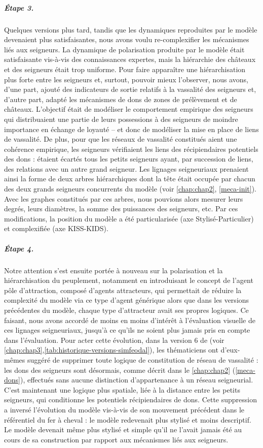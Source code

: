 \subparagraph{Étape 3.}
Quelques versions plus tard, tandis que les dynamiques reproduites par le modèle devenaient plus satisfaisantes, nous avons voulu re-complexifier les mécanismes liés aux seigneurs.
La dynamique de polarisation produite par le modèle était satisfaisante vis-à-vis des connaissances expertes, mais la hiérarchie des châteaux et des seigneurs était trop uniforme.
Pour faire apparaître une hiérarchisation plus forte entre les seigneurs et, surtout, pouvoir mieux l'observer, nous avons, d'une part, ajouté des indicateurs de sortie relatifs à la vassalité des seigneurs et, d'autre part, adapté les mécanismes de dons de zones de prélèvement et de châteaux.
L'objectif était de modéliser le comportement empirique des seigneurs qui distribuaient une partie de leurs possessions à des seigneurs de moindre importance en échange de loyauté -- et donc de modéliser la mise en place de liens de vassalité.
De plus, pour que les réseaux de vassalité constitués aient une cohérence empirique, les seigneurs vérifiaient les liens des récipiendaires potentiels des dons :
	étaient écartés tous les petits seigneurs ayant, par succession de liens, des relations avec un autre grand seigneur.
Les lignages seigneuriaux prenaient ainsi la forme de deux arbres hiérarchiques dont la tête était occupée par chacun des deux grands seigneurs concurrents du modèle (voir \cref{chap:chap2}, \cref{meca-init}).
Avec les graphes constitués par ces arbres, nous pouvions alors mesurer leurs degrés, leurs diamètres, la somme des puissances des seigneurs, etc.
Par ces modifications, la position du modèle a été particularisée (axe Stylisé-Particulier) et complexifiée (axe KISS-KIDS).

\subparagraph{Étape 4.}
Notre attention s'est ensuite portée à nouveau sur la polarisation et la hiérarchisation du peuplement, notamment en introduisant le concept de l'agent \og pôle d'attraction\fg{}, composé d'agents attracteurs, qui permettait de réduire la complexité du modèle via ce type d'agent générique alors que dans les versions précédentes du modèle, chaque type d'attracteur avait ses propres logiques.
Ce faisant, nous avons accordé de moins en moins d'intérêt à l'évaluation visuelle de ces lignages seigneuriaux, jusqu'à ce qu'ils ne soient plus jamais pris en compte dans l'évaluation.
Pour acter cette évolution, dans la version 6 de \simfeodal{} (voir \cref{chap:chap3},\cref{tab:historique-versions-simfeodal}), les thématiciens ont d'eux-mêmes suggéré de supprimer toute logique de constitution de réseau de vassalité :
	les dons des seigneurs sont désormais, comme décrit dans le \cref{chap:chap2} (\cref{meca-dons}), effectués sans aucune distinction d'appartenance à un réseau seigneurial.
C'est maintenant une logique plus spatiale, liée à la distance entre les petits seigneurs, qui conditionne les potentiels récipiendaires de dons.
Cette suppression a inversé l'évolution du modèle vis-à-vis de son mouvement précédent dans le référentiel du fer à cheval :
	le modèle redevenait plus stylisé et moins descriptif.
Le modèle devenait même plus stylisé et simple qu'il ne l'avait jamais été au cours de sa construction par rapport aux mécanismes liés aux seigneurs.

